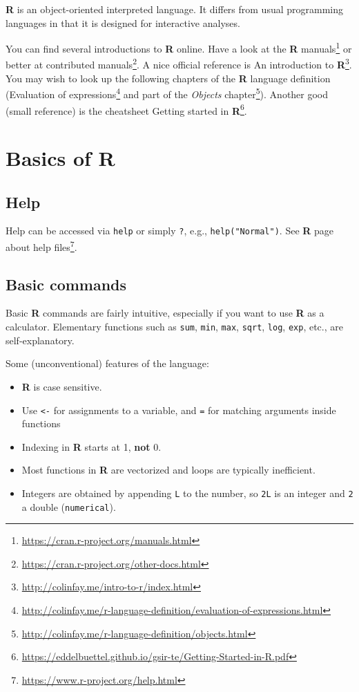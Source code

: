 \documentclass[
  11pt,
  letterpaper,
]{book}
\providecommand{\tightlist}{%
  \setlength{\itemsep}{0pt}\setlength{\parskip}{0pt}}
\renewcommand{\href}[2]{#2\footnote{\url{#1}}}
\theoremstyle{definition}
\theoremstyle{definition}
\theoremstyle{definition}
\theoremstyle{remark}
\begin{document}
\textbf{R} is an object-oriented interpreted language. It differs from usual programming languages in that it is designed for interactive analyses.

You can find several introductions to \textbf{R} online. Have a look at the \href{https://cran.r-project.org/manuals.html}{\textbf{R} manuals} or better at \href{https://cran.r-project.org/other-docs.html}{contributed manuals}. A nice official reference is \href{http://colinfay.me/intro-to-r/index.html}{An introduction to \textbf{R}}.
You may wish to look up the following chapters of the \textbf{R} language definition (\href{http://colinfay.me/r-language-definition/evaluation-of-expressions.html}{Evaluation of expressions} and part of the \href{http://colinfay.me/r-language-definition/objects.html}{\emph{Objects} chapter}). Another good (small reference) is the cheatsheet \href{https://eddelbuettel.github.io/gsir-te/Getting-Started-in-R.pdf}{Getting started in \textbf{R}}.

\hypertarget{basics-of-r}{%
\section{\texorpdfstring{Basics of \textbf{R}}{Basics of R}}\label{basics-of-r}}

\hypertarget{help}{%
\subsection{Help}\label{help}}

Help can be accessed via \texttt{help} or simply \texttt{?}, e.g., \texttt{help("Normal")}. \href{https://www.r-project.org/help.html}{See \textbf{R} page about help files}.

\hypertarget{basic-commands}{%
\subsection{Basic commands}\label{basic-commands}}

Basic \textbf{R} commands are fairly intuitive, especially if you want to use \textbf{R} as a calculator.
Elementary functions such as \texttt{sum}, \texttt{min}, \texttt{max}, \texttt{sqrt}, \texttt{log}, \texttt{exp}, etc., are self-explanatory.

Some (unconventional) features of the language:

\begin{itemize}
\tightlist
\item
  \textbf{R} is case sensitive.
\item
  Use \texttt{\textless{}-} for assignments to a variable, and \texttt{=} for matching arguments inside functions
\item
  Indexing in \textbf{R} starts at 1, \textbf{not} 0.
\item
  Most functions in \textbf{R} are vectorized and loops are typically inefficient.
\item
  Integers are obtained by appending \texttt{L} to the number, so \texttt{2L} is an integer and \texttt{2} a double (\texttt{numerical}).
\end{itemize}
\end{document}
